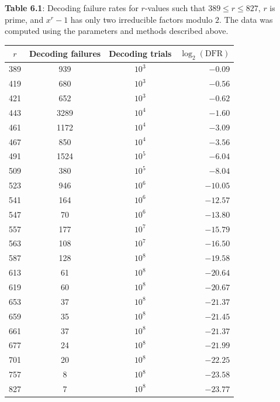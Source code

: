 \newpage

\begin{flushleft}
    \textbf{Table 6.1}: Decoding failure rates for $r$-values such that $389 \leq r \leq 827$, $r$ is prime, and $x^r - 1$ has only two irreducible factors modulo $2$. The data was computed using the parameters and methods described above.
    \end{flushleft}
\begin{table}[htb]
    \begin{center}
        \begin{tabular}{c|c|c|r}
            \;\;\;$r$\;\;\; & \;Decoding failures\;  & \;Decoding trials\;  & \;$\log_2(\mathrm{DFR})$ \\
            \hline
            389 & 939 & $10^3$ & $-0.09$ \\
            419 & 680 & $10^3$ & $-0.56$ \\
            421 & 652 & $10^3$ & $-0.62$ \\
            443 & 3289 & $10^4$ & $-1.60$ \\
            461 & 1172 & $10^4$ & $-3.09$ \\
            467 & 850 & $10^4$ & $-3.56$ \\
            491 & 1524 & $10^5$ & $-6.04$ \\
            509 & 380 & $10^5$ & $-8.04$ \\
            523 & 946 & $10^6$ & $-10.05$ \\
            541 & 164 & $10^6$ & $-12.57$ \\
            547 & 70 & $10^6$ & $-13.80$ \\
            557 & 177 & $10^7$ & $-15.79$ \\
            563 & 108 & $10^7$ & $-16.50$ \\
            587 & 128 & $10^8$ & $-19.58$ \\
            613 & 61 & $10^8$ & $-20.64$ \\
            619 & 60 & $10^8$ & $-20.67$ \\
            653 & 37 & $10^8$ & $-21.37$ \\
            659 & 35 & $10^8$ & $-21.45$ \\
            661 & 37 & $10^8$ & $-21.37$ \\
            677 & 24 & $10^8$ & $-21.99$ \\
            701 & 20 & $10^8$ & $-22.25$ \\
            757 & 8 & $10^8$ & $-23.58$ \\
            827 & 7 & $10^8$ & $-23.77$
        \end{tabular}
    \end{center}
    \label{table:DFR}
\end{table}
